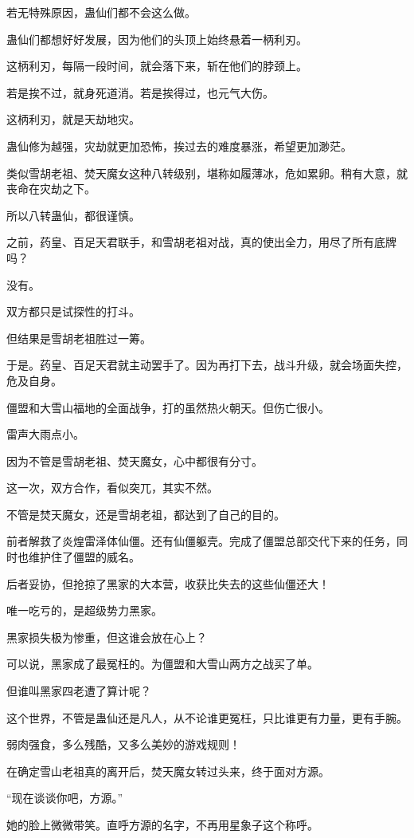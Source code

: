 \begin{this_body}
若无特殊原因，蛊仙们都不会这么做。

蛊仙们都想好好发展，因为他们的头顶上始终悬着一柄利刃。

这柄利刃，每隔一段时间，就会落下来，斩在他们的脖颈上。

若是挨不过，就身死道消。若是挨得过，也元气大伤。

这柄利刃，就是天劫地灾。

蛊仙修为越强，灾劫就更加恐怖，挨过去的难度暴涨，希望更加渺茫。

类似雪胡老祖、焚天魔女这种八转级别，堪称如履薄冰，危如累卵。稍有大意，就丧命在灾劫之下。

所以八转蛊仙，都很谨慎。

之前，药皇、百足天君联手，和雪胡老祖对战，真的使出全力，用尽了所有底牌吗？

没有。

双方都只是试探性的打斗。

但结果是雪胡老祖胜过一筹。

于是。药皇、百足天君就主动罢手了。因为再打下去，战斗升级，就会场面失控，危及自身。

僵盟和大雪山福地的全面战争，打的虽然热火朝天。但伤亡很小。

雷声大雨点小。

因为不管是雪胡老祖、焚天魔女，心中都很有分寸。

这一次，双方合作，看似突兀，其实不然。

不管是焚天魔女，还是雪胡老祖，都达到了自己的目的。

前者解救了炎煌雷泽体仙僵。还有仙僵躯壳。完成了僵盟总部交代下来的任务，同时也维护住了僵盟的威名。

后者妥协，但抢掠了黑家的大本营，收获比失去的这些仙僵还大！

唯一吃亏的，是超级势力黑家。

黑家损失极为惨重，但这谁会放在心上？

可以说，黑家成了最冤枉的。为僵盟和大雪山两方之战买了单。

但谁叫黑家四老遭了算计呢？

这个世界，不管是蛊仙还是凡人，从不论谁更冤枉，只比谁更有力量，更有手腕。

弱肉强食，多么残酷，又多么美妙的游戏规则！

在确定雪山老祖真的离开后，焚天魔女转过头来，终于面对方源。

“现在谈谈你吧，方源。”

她的脸上微微带笑。直呼方源的名字，不再用星象子这个称呼。


\end{this_body}
